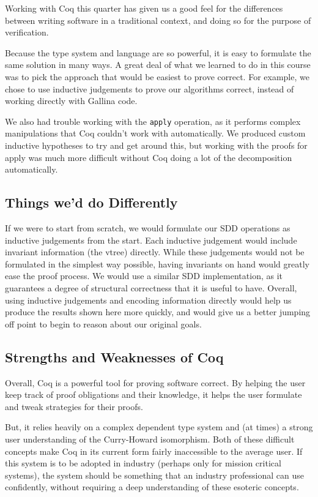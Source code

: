 \documentclass[twocolumn]{article}
\theoremstyle{definition}
\begin{document}
Working with Coq this quarter has given us a good feel for the differences between writing software in a traditional context, and doing so for the purpose of verification. 

Because the type system and language are so powerful, it is easy to formulate the same solution in many ways. A great deal of what we learned to do in this course was to pick the approach that would be easiest to prove correct. For example, we chose to use inductive judgements to prove our algorithms correct, instead of working directly with Gallina code. 

We also had trouble working with the \texttt{apply} operation, as it performs complex manipulations that Coq couldn't work with automatically. We produced custom inductive hypotheses to try and get around this, but working with the proofs for apply was much more difficult without Coq doing a lot of the decomposition automatically.

\subsection{Things we'd do Differently}

If we were to start from scratch, we would formulate our SDD operations as inductive judgements from the start. Each inductive judgement would include invariant information (the vtree) directly. While these judgements would not be formulated in the simplest way possible, having invariants on hand would greatly ease the proof process. We would use a similar SDD implementation, as it guarantees a degree of structural correctness that it is useful to have. Overall, using inductive judgements and encoding information directly would help us produce the results shown here more quickly, and would give us a better jumping off point to begin to reason about our original goals.

\subsection{Strengths and Weaknesses of Coq}

Overall, Coq is a powerful tool for proving software correct. By helping the user keep track of proof obligations and their knowledge, it helps the user formulate and tweak strategies for their proofs. 

But, it relies heavily on a complex dependent type system and (at times) a strong user understanding of the Curry-Howard isomorphism. Both of these difficult concepts make  Coq in its current form fairly inaccessible to the average user. If this system is to be adopted in industry (perhaps only for mission critical systems), the system should be something that an industry professional can use confidently, without requiring a deep understanding of these esoteric concepts.



\end{document}
